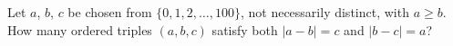 Let $a$, $b$, $c$ be chosen from $\{0,1,2,\dots,100\}$, not necessarily distinct, with $a\ge b$. How many ordered triples $(a,b,c)$ satisfy both $|a-b|=c$ and $|b-c|=a$?
